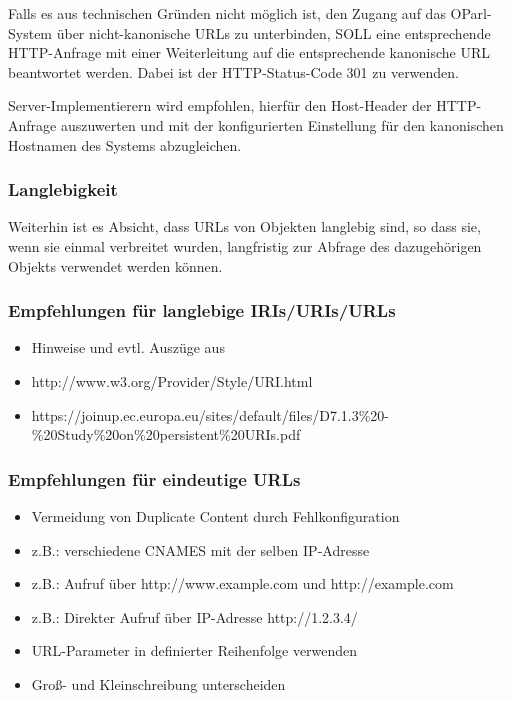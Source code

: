 \documentclass[,a4paper]{article}
\begin{document}
Falls es aus technischen Gründen nicht möglich ist, den Zugang auf das
OParl-System über nicht-kanonische URLs zu unterbinden, SOLL eine
entsprechende HTTP-Anfrage mit einer Weiterleitung auf die entsprechende
kanonische URL beantwortet werden. Dabei ist der HTTP-Status-Code 301 zu
verwenden.

Server-Implementierern wird empfohlen, hierfür den Host-Header der
HTTP-Anfrage auszuwerten und mit der konfigurierten Einstellung für den
kanonischen Hostnamen des Systems abzugleichen.

\subsubsection{Langlebigkeit}

Weiterhin ist es Absicht, dass URLs von Objekten langlebig sind, so dass
sie, wenn sie einmal verbreitet wurden, langfristig zur Abfrage des
dazugehörigen Objekts verwendet werden können.

\subsubsection{Empfehlungen für langlebige IRIs/URIs/URLs}

\begin{itemize}
\item
  Hinweise und evtl. Auszüge aus
\item
  http://www.w3.org/Provider/Style/URI.html
\item
  https://joinup.ec.europa.eu/sites/default/files/D7.1.3\%20-\%20Study\%20on\%20persistent\%20URIs.pdf
\end{itemize}

\subsubsection{Empfehlungen für eindeutige URLs}

\begin{itemize}
\item
  Vermeidung von Duplicate Content durch Fehlkonfiguration
\item
  z.B.: verschiedene CNAMES mit der selben IP-Adresse
\item
  z.B.: Aufruf über http://www.example.com und http://example.com
\item
  z.B.: Direkter Aufruf über IP-Adresse http://1.2.3.4/
\item
  URL-Parameter in definierter Reihenfolge verwenden
\item
  Groß- und Kleinschreibung unterscheiden
\end{itemize}
\end{document}
